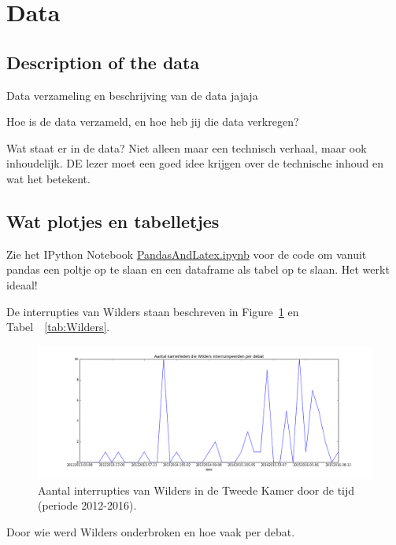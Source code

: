 \section{Data}
\label{sec:meth}


\subsection{Description of the data}
Data verzameling en beschrijving van de data jajaja

Hoe is de data verzameld, en hoe heb jij die data verkregen?


Wat staat er in de data? Niet alleen maar een technisch verhaal, maar ook inhoudelijk. DE lezer moet een goed idee krijgen over de technische inhoud en wat het betekent.

\pagebreak
\subsection{Wat plotjes en tabelletjes}

Zie het IPython Notebook \url{PandasAndLatex.ipynb} voor de code om vanuit pandas een poltje op te slaan en een dataframe als tabel op te slaan. Het werkt ideaal! 

De interrupties van Wilders staan beschreven in Figure~\ref{fig:wilders} en Tabel~~\ref{tab:Wilders}.


\begin{figure}
\begin{center}
\includegraphics[width=\linewidth]{WildersPlot.png}
\caption{\label{fig:wilders} Aantal interrupties van Wilders in de Tweede Kamer door de tijd (periode 2012-2016).}
\end{center}
\end{figure}


\pagebreak

\begin{table}[h]
\begin{footnotesize}

\end{footnotesize}
\caption{\label{tab:Wilders} Door wie werd Wilders onderbroken en hoe vaak per debat.}
\end{table}


